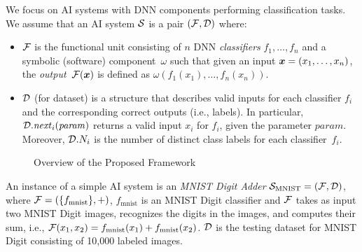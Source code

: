 We focus on AI systems with DNN components performing classification tasks. We assume that an AI system $\S$ is a pair $(\F,\D)$ where:
\begin{itemize}
    \item $\F$ is the functional unit consisting of $n$ DNN \emph{classifiers} $f_1,\dots,f_n$ and a symbolic (software) component~$\omega$ such that given an input $\avec{x}=(x_1,\dots,x_n)$, the \emph{output}~$\F(\avec{x})$ is defined as $\omega(f_1(x_1),\dots,f_n(x_n))$.
    \item $\D$ (for dataset) is a structure that describes valid inputs for each classifier $f_i$ and the corresponding correct outputs (i.e., labels). In particular, $\D.\mathit{next}_i(\mathit{param})$ returns a valid input $x_i$ for $f_i$, given the parameter $\mathit{param}$. Moreover, $\D.N_i$ is the number of distinct class labels for each classifier~$f_i$.
\end{itemize}

\begin{figure}[h]
  \centering
  \caption{Overview of the Proposed Framework}
  \label{fig:framework}
\end{figure}

\begin{example}
\label{ex:mnist-adder}
An instance of a simple AI system is an \emph{MNIST Digit Adder} $\S_{\text{MNIST}} = (\F,\D)$, where $\F = (\{f_{\text{mnist}}\}, +)$, $f_{\text{mnist}}$ is an MNIST Digit classifier and $\F$ takes as input two MNIST Digit images, recognizes the digits in the images, and computes their sum, i.e., $\F(x_1,x_2) = f_{\text{mnist}}(x_1) + f_{\text{mnist}}(x_2)$. $\D$ is the testing dataset for MNIST Digit consisting of 10,000 labeled images.
\end{example}

